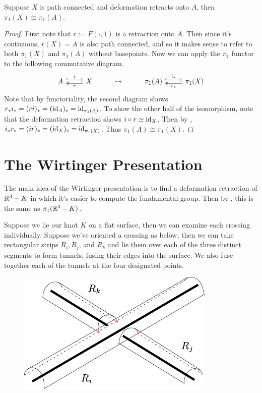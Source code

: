 \documentclass[twoside,10pt]{article}
\begin{document}
\begin{thrm}
	\label{DR-homeo}
	Suppose $X$ is path connected and deformation retracts onto $A$, then $\pi_1(X) \cong \pi_1(A)$.
\end{thrm}
\begin{proof}
	First note that $r := F(\cdot,1)$ is a retraction onto $A$. Then since it's continuous, $r(X) = A$ is also path connected, and so it makes sense to refer to both $\pi_1(X)$ and $\pi_1(A)$ without basepoints. Now we can apply the $\pi_1$ functor to the following commutative diagram.
	\[
	\begin{tikzcd}
		A \rar[hook, shift left]{i} & X \lar[two heads, shift left]{r} & \leadsto & \pi_1(A) \rar[hook, shift left]{i_{*}} & \pi_1(X) \lar[two heads, shift left]{r_{*}}
	\end{tikzcd}
	\] 
	Note that by functoriality, the second diagram shows $r_{*}i_{*} = (ri)_{*} = (\operatorname{id}_{A})_{*}=\operatorname{id}_{\pi_1(A)}$. To show the other half of the isomorphism, note that the deformation retraction shows $i \circ r \simeq \operatorname{id}_{X}$. Then by , $i_{*}r_{*} = (ir)_{*} = (\operatorname{id}_{X})_{*} = \operatorname{id}_{\pi_1(X)}$. Thus $\pi_1(A) \cong \pi_1(X)$.
\end{proof}


\section{The Wirtinger Presentation}

The main idea of the Wirtinger presentation is to find a deformation retraction of $\mathbb{R}^{3}-K$ in which it's easier to compute the fundamental group. Then by , this is the same as $\pi_1(\mathbb{R}^{3}-K)$.

Suppose we lie our knot $K$ on a flat surface, then we can examine each crossing individually. Suppose we've oriented a crossing as below, then we can take rectangular strips $R_i, R_j$, and $R_k$ and lie them over each of the three distinct segments to form tunnels, fusing their edges into the surface. We also fuse together each of the tunnels at the four designated points.

\begin{figure}[H]
	\centering
	\includegraphics[scale=1.5]{fig/rectangles.pdf}
\end{figure}
\end{document}
